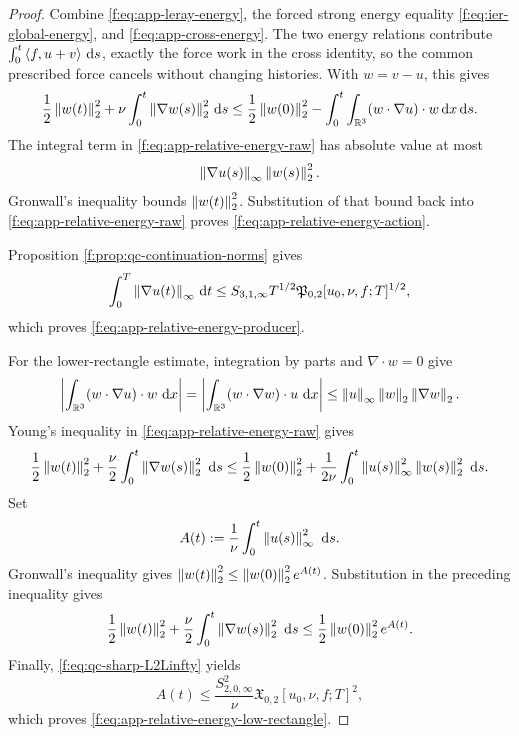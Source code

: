 \begin{proof}
Combine \eqref{f:eq:app-leray-energy}, the forced strong energy equality
\eqref{f:eq:ier-global-energy}, and \eqref{f:eq:app-cross-energy}.  The two
energy relations contribute
\(\int_0^t\left\langle f,u+v\right\rangle\,\mathrm d s\), exactly the force work in the cross identity,
so the common prescribed force cancels without changing histories.  With
\(w=v-u\), this gives
\begin{equation}
 \frac12\left\lVert w(t)\right\rVert_2^2
 +\nu\int_0^t\left\lVert \nabla w(s)\right\rVert_2^2\,\mathrm d s
 \le
 \frac12\left\lVert w(0)\right\rVert_2^2
 -\int_0^t\int_{\mathbb R^3}(w\cdot\nabla u)\cdot w\,\mathrm d x\,\mathrm d s.
 \label{f:eq:app-relative-energy-raw}
\end{equation}
The integral term in \eqref{f:eq:app-relative-energy-raw} has absolute value at
most
\[
 \left\lVert \nabla u(s)\right\rVert_\infty\left\lVert w(s)\right\rVert_2^2.
\]
Gronwall's inequality bounds \(\left\lVert w(t)\right\rVert_2^2\).  Substitution of that
bound back into \eqref{f:eq:app-relative-energy-raw} proves
\eqref{f:eq:app-relative-energy-action}.
\begin{samepage}
Proposition
\ref{f:prop:qc-continuation-norms} gives
\[
 \int_0^T\left\lVert \nabla u(t)\right\rVert_\infty\,\mathrm d t
 \le
 S_{3,1,\infty}T^{1/2}
 \mathfrak P_{0,2}[u_0,\nu,f;T]^{1/2},
\]
which proves \eqref{f:eq:app-relative-energy-producer}.
\end{samepage}

For the lower-rectangle estimate, integration by parts and
\(\nabla\cdot w=0\) give
\[
 \left|\int_{\mathbb R^3}(w\cdot\nabla u)\cdot w\,\,\mathrm d x\right|
 =\left|\int_{\mathbb R^3}(w\cdot\nabla w)\cdot u\,\,\mathrm d x\right|
 \le\left\lVert u\right\rVert_\infty\left\lVert w\right\rVert_2\left\lVert \nabla w\right\rVert_2.
\]
Young's inequality in \eqref{f:eq:app-relative-energy-raw} gives
\begin{align*}
 \frac12\left\lVert w(t)\right\rVert_2^2
 +\frac\nu2\int_0^t\left\lVert \nabla w(s)\right\rVert_2^2\,\,\mathrm d s
 \le\frac12\left\lVert w(0)\right\rVert_2^2
 +\frac1{2\nu}\int_0^t\left\lVert u(s)\right\rVert_\infty^2
 \left\lVert w(s)\right\rVert_2^2\,\,\mathrm d s.
\end{align*}
Set
\[
 A(t):=\frac1\nu\int_0^t\left\lVert u(s)\right\rVert_\infty^2\,\,\mathrm d s.
\]
Gronwall's inequality gives
\(\left\lVert w(t)\right\rVert_2^2\le\left\lVert w(0)\right\rVert_2^2e^{A(t)}\).  Substitution in the
preceding inequality gives
\[
 \frac12\left\lVert w(t)\right\rVert_2^2
 +\frac\nu2\int_0^t\left\lVert \nabla w(s)\right\rVert_2^2\,\,\mathrm d s
 \le\frac12\left\lVert w(0)\right\rVert_2^2e^{A(t)}.
\]
Finally, \eqref{f:eq:qc-sharp-L2Linfty} yields
\[
 A(t)\le\frac{S_{2,0,\infty}^2}{\nu}
 \mathfrak X_{0,2}[u_0,\nu,f;T]^2,
\]
which proves \eqref{f:eq:app-relative-energy-low-rectangle}.
\end{proof}

